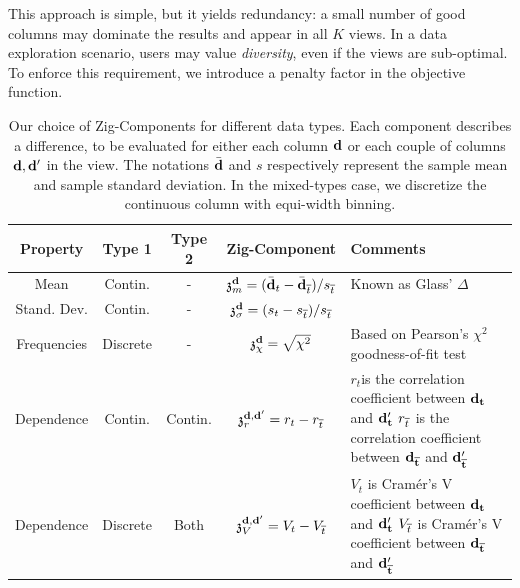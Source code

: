 This approach is simple, but it yields redundancy: a small number of good
columns may dominate the results and appear in all $K$ views. In a data
exploration scenario, users may value \emph{diversity}, even if the views are
sub-optimal. To enforce this requirement, we introduce a penalty factor in the
objective function.
\begin{table}[t!]
    \centering
    \begin{tabular}{ccccp{9cm}}
      \hline
    \rowcolor{gray!50}
      Property & Type 1 & Type 2 & Zig-Component & Comments\\
      \hline
      Mean & Contin.  & - &
      $  \mathfrak{z}_m^{\bf{d}}  = (\bar{\bf{d}}_t - \bar{\bf{d}}_{\overline{t}}) / s_{\overline{t}}$ & 
      Known as Glass' $\Delta$~\cite{hedges2014statistical}\\
      Stand. Dev.& Contin.  & - &
      $ \mathfrak{z}_{\sigma}^{\bf{d}}=(s_t-s_{\overline{t}})/s_{\overline{t}}$ & \\
      Frequencies & Discrete & - & 
      $\mathfrak{z}_\chi ^{\bf{d}}= \sqrt{\chi^2}$ &
      Based on Pearson's $\chi^2$ goodness-of-fit test~\cite{wasserman2013all}\\
      Dependence & Contin. & Contin. & $\mathfrak{z}_r^{\bf{d}, \bf{d}'}  = r_t - r_{\overline{t}} $ & 
      $r_t$is the correlation coefficient between $\bf{d}_t$ and  $\bf{d}'_t$\newline
      $r_{\overline{t}}$ is the correlation coefficient between $\bf{d}_{\overline{t}}$ and
      $\bf{d}'_{\overline{t}}$~\cite{wasserman2013all}\\
     Dependence  & Discrete & Both & $ \mathfrak{z}_V^{\bf{d}, \bf{d}'} = V_t - V_{\overline{t}} $ &
           $V_t$ is Cram\'er's V coefficient between $\bf{d}_t$ and  $\bf{d}'_t$ \newline
           $V_{\overline{t}}$ is Cram\'er's V coefficient between $\bf{d}_{\overline{t}}$ and
           $\bf{d}'_{\overline{t}}$~\cite{cohen1977statistical} \\ 
      \hline
    \end{tabular}
    \caption{Our choice of Zig-Components for different data types. Each
        component describes a difference, to be evaluated for either each
        column $\bf{d}$ or each couple of columns $\bf{d}, \bf{d}'$ in the
        view. The notations $\bar{\bf{d}}$ and $s$ respectively represent the
        sample mean and sample standard deviation. In the mixed-types case, we
        discretize the continuous column with equi-width binning.}
    \label{tab:dissim}
\end{table}

